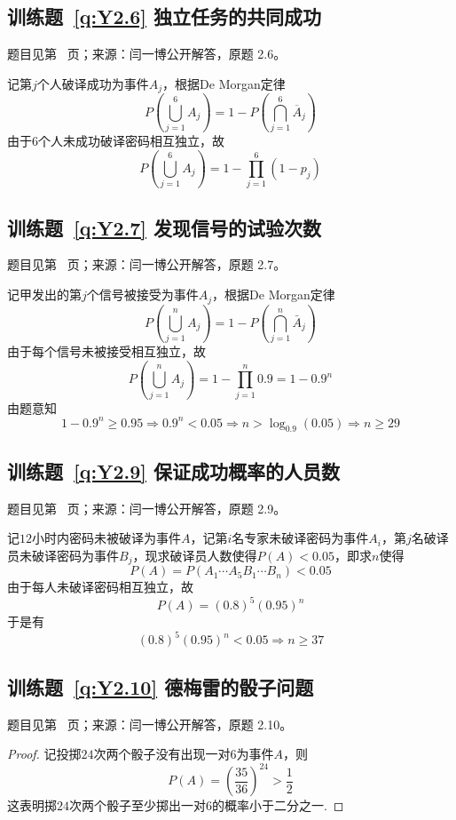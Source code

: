 \documentclass[UTF8,12pt,a4paper,fontset=fandol]{ctexbook}
\begin{document}
\subsection*{训练题~\ref{q:Y2.6} 独立任务的共同成功}\label{a:Y2.6}{\small 题目见第~\pageref{q:Y2.6} 页；来源：闫一博公开解答，原题 2.6。}
\begin{solve}
记第$j$个人破译成功为事件$A_j$，根据De Morgan定律
\[P(\bigcup\limits_{j = 1}^6 {{A_j}} ) = 1 - P(\bigcap\limits_{j = 1}^6 {{{\overline A }_j}} )\]
由于$6$个人未成功破译密码相互独立，故
\[P(\bigcup\limits_{j = 1}^6 {{A_j}} ) = 1 - \prod\limits_{j = 1}^6 {(1 - {p_j})} \]
\end{solve}

\subsection*{训练题~\ref{q:Y2.7} 发现信号的试验次数}\label{a:Y2.7}{\small 题目见第~\pageref{q:Y2.7} 页；来源：闫一博公开解答，原题 2.7。}
\begin{solve}
记甲发出的第$j$个信号被接受为事件$A_j$，根据De Morgan定律
\[P(\bigcup\limits_{j = 1}^n {{A_j}} ) = 1 - P(\bigcap\limits_{j = 1}^n {{{\bar A}_j}} )\]
由于每个信号未被接受相互独立，故
\[P(\bigcup\limits_{j = 1}^n {{A_j}} ) = 1 - \prod\limits_{j = 1}^n {0.9}  = 1 - {0.9^n}\]
由题意知
\[1 - {0.9^n} \geqslant 0.95 \Rightarrow {0.9^n} < 0.05 \Rightarrow n > {\log _{0.9}}(0.05) \Rightarrow n \geqslant 29\]
\end{solve}

\subsection*{训练题~\ref{q:Y2.9} 保证成功概率的人员数}\label{a:Y2.9}{\small 题目见第~\pageref{q:Y2.9} 页；来源：闫一博公开解答，原题 2.9。}
\begin{solve}
记$12$小时内密码未被破译为事件$A$，记第$i$名专家未破译密码为事件$A_i$，第$j$名破译员未破译密码为事件$B_j$，现求破译员人数使得$P(A)<0.05$，即求$n$使得
\[P(A) = P({A_1} \cdots {A_5}{B_1} \cdots {B_n}) < 0.05\]
由于每人未破译密码相互独立，故
\[P(A) = {(0.8)^5}{(0.95)^n}\]
于是有
\[{(0.8)^5}{(0.95)^n} < 0.05 \Rightarrow n \geqslant 37\]
\end{solve}

\subsection*{训练题~\ref{q:Y2.10} 德梅雷的骰子问题}\label{a:Y2.10}{\small 题目见第~\pageref{q:Y2.10} 页；来源：闫一博公开解答，原题 2.10。}
\begin{proof}
记投掷$24$次两个骰子没有出现一对$6$为事件$A$，则
\[P(A) = {\left( {\frac{{35}}{{36}}} \right)^{24}} > \frac{1}{2}\]
这表明掷$24$次两个骰子至少掷出一对$6$的概率小于二分之一.
\end{proof}
\end{document}
